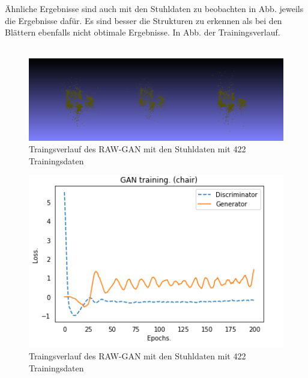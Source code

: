 \documentclass{llncs}
\begin{document}
Ähnliche Ergebnisse sind auch mit den Stuhldaten zu beobachten in Abb. jeweils die Ergebnisse dafür. Es sind besser die Strukturen zu erkennen als bei den Blättern ebenfalls nicht obtimale Ergebnisse. In Abb. der Trainingsverlauf. 
\\\\

\begin{figure}[htbp] 
	\centering
	\includegraphics[width=1.2\textwidth]{raw_gan_result_400_result.png}
	\caption{Traingsverlauf des RAW-GAN mit den Stuhldaten mit 422 Trainingsdaten}
	\label{fig:Bild35}
\end{figure}
\begin{figure}[htbp] 
	\centering
	\includegraphics[width=1.2\textwidth]{raw_gan_result_400_examples.png}
	\caption{Traingsverlauf des RAW-GAN mit den Stuhldaten mit 422 Trainingsdaten}
	\label{fig:Bild36}
\end{figure}
\end{document}
